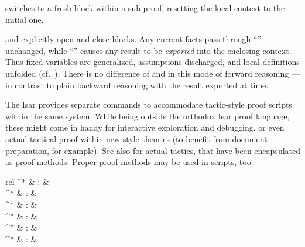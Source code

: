 \begin{isabellebody}
\begin{isamarkuptext}
\begin{descr}
  \item [\mbox{\isa{\isacommand{next}}}] switches to a fresh block within a
  sub-proof, resetting the local context to the initial one.

  \item [\mbox{\isa{\isacommand{{\isacharbraceleft}}}} and \mbox{\isa{\isacommand{{\isacharbraceright}}}}] explicitly open and close
  blocks.  Any current facts pass through ``\mbox{\isa{\isacommand{{\isacharbraceleft}}}}''
  unchanged, while ``\mbox{\isa{\isacommand{{\isacharbraceright}}}}'' causes any result to be
  \emph{exported} into the enclosing context.  Thus fixed variables
  are generalized, assumptions discharged, and local definitions
  unfolded (cf.\ ).  There is no difference
  of \mbox{} and \mbox{} in this mode of
  forward reasoning --- in contrast to plain backward reasoning with
  the result exported at \mbox{} time.

  \end{descr}%
\end{isamarkuptext}%
\isamarkuptrue%
%
\isamarkuptrue%
%
\begin{isamarkuptext}%
The Isar provides separate commands to accommodate tactic-style
  proof scripts within the same system.  While being outside the
  orthodox Isar proof language, these might come in handy for
  interactive exploration and debugging, or even actual tactical proof
  within new-style theories (to benefit from document preparation, for
  example).  See also  for actual tactics, that
  have been encapsulated as proof methods.  Proper proof methods may
  be used in scripts, too.

  \begin{matharray}{rcl}
    \mbox{}^* & : &  \\
    \mbox{}^* & : &  \\
    \mbox{}^* & : &  \\
    \mbox{}^* & : &  \\
    \mbox{}^* & : &  \\
    \mbox{}^* & : &  \\
  \end{matharray}


\end{isamarkuptext}
\end{isabellebody}
